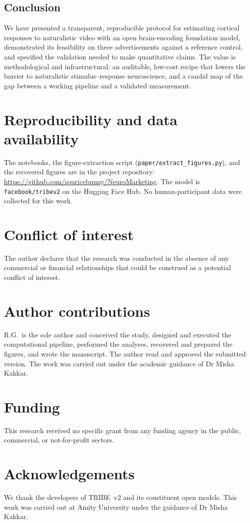 \documentclass[11pt]{article}
\begin{document}
\subsection{Conclusion}
We have presented a transparent, reproducible protocol for estimating cortical
responses to naturalistic video with an open brain-encoding foundation model,
demonstrated its feasibility on three advertisements against a reference
control, and specified the validation needed to make quantitative claims. The
value is methodological and infrastructural: an auditable, low-cost recipe that
lowers the barrier to naturalistic stimulus--response neuroscience, and a
candid map of the gap between a working pipeline and a validated measurement.

\section*{Reproducibility and data availability}
The notebooks, the figure-extraction script (\texttt{paper/extract\_figures.py}),
and the recovered figures are in the project repository:
\url{https://github.com/souricebunny/NeuroMarketing}. The model is
\texttt{facebook/tribev2} on the Hugging Face Hub. No human-participant data
were collected for this work.

\section*{Conflict of interest}
The author declares that the research was conducted in the absence of any
commercial or financial relationships that could be construed as a potential
conflict of interest.

\section*{Author contributions}
R.G.\ is the sole author and conceived the study, designed and executed the
computational pipeline, performed the analyses, recovered and prepared the
figures, and wrote the manuscript. The author read and approved the submitted
version. The work was carried out under the academic guidance of Dr Misha
Kakkar.

\section*{Funding}
This research received no specific grant from any funding agency in the public,
commercial, or not-for-profit sectors. %

\section*{Acknowledgements}
We thank the developers of TRIBE~v2 and its constituent open models. This work
was carried out at Amity University under the guidance of Dr Misha Kakkar.



\end{document}
